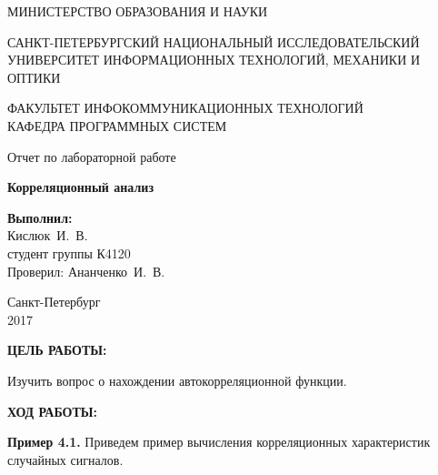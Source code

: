\documentclass[14pt,a4paper]{extreport}
\newcommand{\header}[1]{%
{
\clearpage%
\fontsize{16pt}{14pt}\selectfont
\begin{center}
\textbf{\MakeUppercase{#1}:}
\end{center}
}
}
\newcommand{\labyear}{2017}
\newcommand{\labtitle}{Корреляционный анализ}
\newcommand{\prepod}{Ананченко~И.~В.}
\newcommand{\student}{Кислюк~И.~В.}
\begin{document}
	\begin{titlepage}
	\begin{center}	
		\fontsize{14pt}{14pt}\selectfont
		МИНИСТЕРСТВО ОБРАЗОВАНИЯ И НАУКИ\\

		\vspace*{0.6\baselineskip}

		\MakeUppercase{Санкт-Петербургский Национальный Исследовательский Университет Информационных технологий, механики и оптики}		
		
		\vspace*{0.6\baselineskip}
		\MakeUppercase{Факультет Инфокоммуникационных технологий}\\
		\MakeUppercase{Кафедра программных систем}
	
		\vspace*{7\baselineskip}
		\fontsize{19pt}{18pt}\selectfont
		Отчет по лабораторной работе
		
		\fontsize{20pt}{18pt}\selectfont
		\textbf{\labtitle}\\
		\vspace*{1.15\baselineskip}
		\end{center}
	
	\vspace*{2\baselineskip}
	\begin{flushright}
	\fontsize{14pt}{14pt}\selectfont
	\textbf{Выполнил:}\\
	\student\\
	студент группы К4120\\
	Проверил: \prepod\\
	\end{flushright}
	
	\vspace{\fill}
	\begin{center}
	Санкт-Петербург\\
	\vspace{-1ex}
	\labyear
	\end{center}
	
\end{titlepage}

\fontsize{14pt}{14pt}\selectfont

\header{Цель работы}


Изучить вопрос о нахождении автокорреляционной функции.

\header{Ход работы}


\textbf{Пример 4.1. } Приведем пример вычисления корреляционных характеристик 
случайных сигналов.
 
\end{document}
